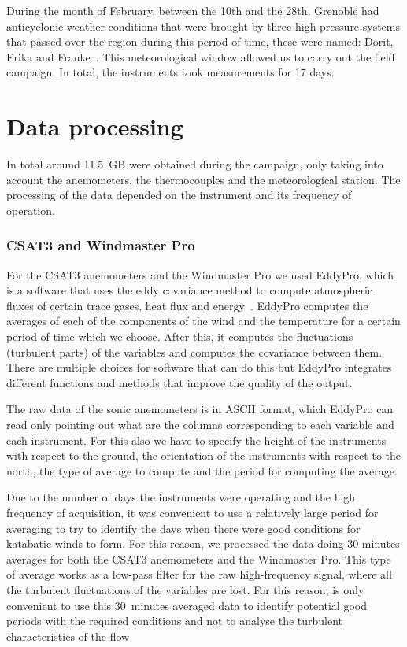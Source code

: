 During the month of February, between the 10th and the 28th,  Grenoble had anticyclonic weather conditions that were brought by three high-pressure systems that passed over the region during this period of time, these were named: Dorit, Erika and Frauke~\citep{highslist}. This meteorological window allowed us to carry out the field campaign. In total, the instruments took measurements for 17 days.

\section{Data processing}

In total around 11.5~GB were obtained during the campaign, only taking into account the anemometers, the thermocouples and the meteorological station. The processing of the data depended on the instrument and its frequency of operation. 

\subsubsection{CSAT3 and Windmaster Pro}

For the CSAT3 anemometers and the Windmaster Pro we used EddyPro, which is a software that uses the eddy covariance method to compute atmospheric fluxes of certain trace gases, heat flux and energy~\citep{burba2013eddy}. EddyPro computes the averages of each of the components of the wind and the temperature for a certain period of time which we choose. After this, it computes the fluctuations (turbulent parts) of the variables and computes the covariance between them. There are multiple choices for software that can do this but EddyPro integrates different functions and methods that improve the quality of the output. 

The raw data of the sonic anemometers is in ASCII format, which EddyPro can read only pointing out what are the columns corresponding to each variable and each instrument. For this also we have to specify the height of the instruments with respect to the ground, the orientation of the instruments with respect to the north, the type of average to compute and the period for computing the average. 

Due to the number of days the instruments were operating and the high frequency of acquisition, it was convenient to use a relatively large period for averaging to try to identify the days when there were good conditions for katabatic winds to form. For this reason, we processed the data doing 30 minutes averages for both the CSAT3 anemometers and the Windmaster Pro. This type of average works as a low-pass filter for the raw high-frequency signal, where all the turbulent fluctuations of the variables are lost. For this reason, is only convenient to use this 30~minutes averaged data to identify potential good periods with the required conditions and not to analyse the turbulent characteristics of the flow

